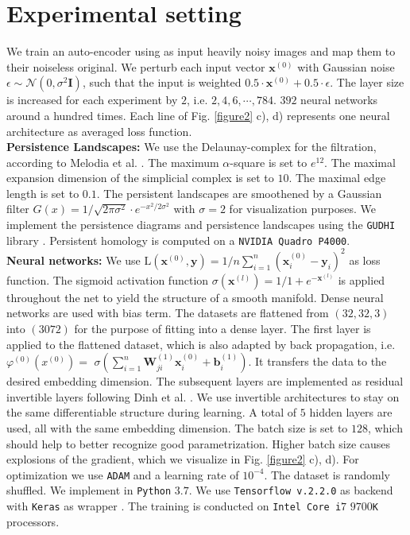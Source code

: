 \documentclass[runningheads,orivec]{llncs}
\begin{document}
\section{Experimental setting}

We train an auto-encoder using as input heavily noisy images and map them to their noiseless original. We perturb each input vector $\textbf{x}^{(0)}$ with Gaussian noise $\epsilon \sim \mathcal{N}(0,\sigma^2 \mathbf{I})$, such that the input is weighted $0.5 \cdot \textbf{x}^{(0)} + 0.5 \cdot \epsilon$. The layer size is increased for each experiment by $2$, i.e. $2,4,6, \cdots, 784$. $392$ neural networks around a hundred times. Each line of Fig. \ref{figure2} c), d) represents one neural architecture as averaged loss function.\\[0.4cm]
\textbf{Persistence Landscapes:} We use the Delaunay-complex for the filtration, according to Melodia et al. \cite{lume}. The maximum $\alpha$-square is set to $e^{12}$. The maximal expansion dimension of the simplicial complex is set to $10$. The maximal edge length is set to $0.1$. The persistent landscapes are smoothened by a Gaussian filter $G(x) = 1 / \sqrt{2 \pi \sigma^2} \cdot e^{- x^2 / 2 \sigma^2}$ with $\sigma = 2$ for visualization purposes. We implement the persistence diagrams and persistence landscapes using the \texttt{GUDHI} library \cite{gudhi:urm}. Persistent homology is computed on a \texttt{NVIDIA Quadro P4000}.\\[0.4cm]
\textbf{Neural networks:} We use $\text{L}(\textbf{x}^{(0)}, \textbf{y}) = 1/n \sum_{i=1}^{n} (\textbf{x}^{(0)}_i-\textbf{y}_i)^2$ as loss function. The sigmoid activation function $\sigma(\mathbf{x}^{(l)}) = 1 / 1 + e^{-\mathbf{x}^{(l)}}$ is applied throughout the net to yield the structure of a smooth manifold. Dense neural networks are used with bias term. The datasets are flattened from $(32,32,3)$ into $(3072)$ for the purpose of fitting into a dense layer. The first layer is applied to the flattened dataset, which is also adapted by back propagation, i.e. $\varphi^{(0)}(x^{(0)}) =$ $\sigma(\sum_{i=1}^{n} \textbf{W}_{ji}^{(1)} \textbf{x}_{i}^{(0)} + \textbf{b}_{i}^{(1)})$. It transfers the data to the desired embedding dimension. The subsequent layers are implemented as residual invertible layers following Dinh et al. \cite{DinhSB17}. We use invertible architectures to stay on the same differentiable structure during learning. A total of $5$ hidden layers are used, all with the same embedding dimension. The batch size is set to $128$, which should help to better recognize good parametrization. Higher batch size causes explosions of the gradient, which we visualize in Fig. \ref{figure2} c), d). For optimization we use \texttt{ADAM} \cite{KingmaB14} and a learning rate of $10^{-4}$. The dataset is randomly shuffled. We implement in \texttt{Python} $3.7$. We use \texttt{Tensorflow v.2.2.0} as backend \cite{tensorflow2015-whitepaper} with \texttt{Keras} as wrapper \cite{chollet2015keras}. The training is conducted on \texttt{Intel Core i}$7$ $9700$\texttt{K} processors.\\[0.4cm]
\end{document}
